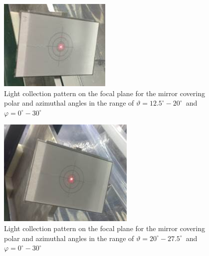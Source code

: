 \begin{figure}[ht]
    \centering
    \includegraphics[width=0.90\linewidth]{images/Focal_Plane_3.jpg}
    \caption{Light collection pattern on the focal plane for the mirror covering polar and azimuthal angles in the range of $\vartheta = 12.5^\circ - 20^\circ$\, and\, $\varphi = 0^\circ - 30^\circ$}
    \label{fig:Focal_Plane_3}
\end{figure}

\begin{figure}[ht]
    \centering
    \includegraphics[width=0.94\linewidth]{images/Focal_Plane_2.jpg}
    \caption{Light collection pattern on the focal plane for the mirror covering polar and azimuthal angles in the range of $\vartheta = 20^\circ - 27.5^\circ$\, and\, $\varphi = 0^\circ - 30^\circ$}
    \label{fig:Focal_Plane_2}
\end{figure}

